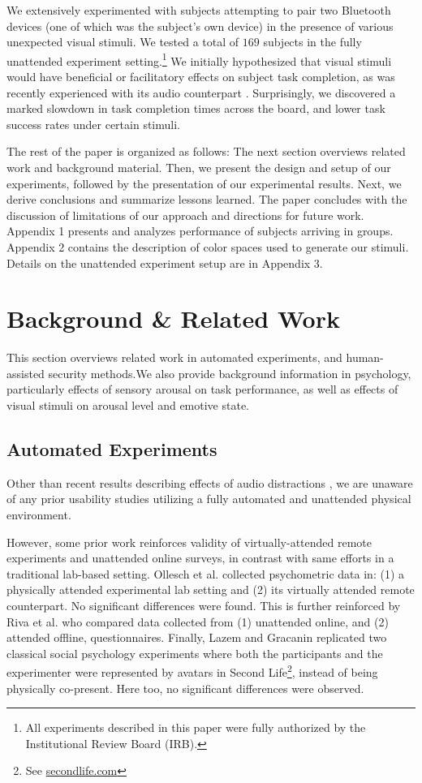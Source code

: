 \documentclass{llncs}
\begin{document}
We extensively experimented with subjects attempting to pair two Bluetooth devices (one of which
was the subject's own device) in the presence of various unexpected visual stimuli. 
We tested a total of $169$ subjects in the fully unattended experiment 
setting.\footnote{
All experiments described in this paper were fully authorized by the Institutional Review Board (IRB).} 
We initially hypothesized 
that visual stimuli would have beneficial or facilitatory effects on subject task completion,
as was recently experienced with its audio counterpart \cite{kaczmarek_unattended_2015}.  
Surprisingly, we discovered a marked slowdown in task completion times across the 
board, and lower task success rates under certain stimuli.

The rest of the paper is organized as follows: The next section overviews related 
work and background material. Then, we present the design and setup of our 
experiments, followed by the presentation of our experimental results. Next, we derive 
conclusions and summarize lessons learned. The paper concludes with the discussion of 
limitations of our approach and directions for future work. Appendix 1 presents and analyzes
performance of subjects arriving in groups.
Appendix 2 contains the description of color spaces used to generate our stimuli.
Details on the unattended experiment setup are in Appendix 3.
%

\section{Background \& Related Work}
\label{sec:related}
%
This section overviews related work in  automated experiments, and human-assisted 
security methods.We also provide background information in psychology, particularly 
effects of sensory arousal on task performance, as well as effects of visual 
stimuli on arousal level and emotive state.

\subsection{Automated Experiments}
%
Other than recent results describing effects of audio distractions \cite{kaczmarek_unattended_2015},
we are unaware of any prior usability studies utilizing a fully automated and unattended 
physical environment.  

However, some prior work reinforces validity of virtually-attended remote experiments and 
unattended online surveys, in contrast with same efforts in a traditional lab-based setting. Ollesch 
et al.\cite{ollesch_physical_2006} collected psychometric data in: (1) a physically attended 
experimental lab setting and (2) its virtually attended remote counterpart. No significant differences 
were found. This is further reinforced by Riva et al.\cite{riva_use_2003} who 
compared data collected from (1) unattended online, and (2) attended offline, questionnaires. 
Finally, Lazem and Gracanin \cite{lazem_social_2010} replicated two classical social psychology 
experiments where both the participants and the experimenter were represented by avatars in 
Second Life\footnote{See \url{secondlife.com}}, instead of being physically co-present. 
Here too, no significant differences were observed.
\end{document}
